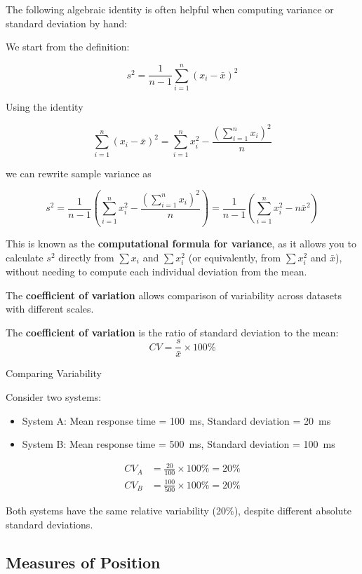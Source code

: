 The following algebraic identity is often helpful when computing variance or standard deviation by hand:

We start from the definition:

\[
s^2 = \frac{1}{n-1}\sum_{i=1}^n (x_i - \bar{x})^2
\]

Using the identity

\[
\sum_{i=1}^n (x_i - \bar{x})^2 = \sum_{i=1}^n x_i^2 - \frac{\left(\sum_{i=1}^n x_i \right)^2}{n}
\]

we can rewrite sample variance as

\[
s^2 = \frac{1}{n-1} \left( \sum_{i=1}^n x_i^2 - \frac{\left(\sum_{i=1}^n x_i\right)^2}{n} \right) =\frac{1}{n-1}\left(\sum_{i=1}^n x_i^2-n \bar{x}^2\right)
\]

This is known as the \textbf{computational formula for variance}, as it allows you to calculate $s^2$ directly from $\sum x_i$ and $\sum x_i^2$ (or equivalently, from $\sum x_i^2$ and $\bar{x}$), without needing to compute each individual deviation from the mean.


The \textbf{coefficient of variation} allows comparison of variability across datasets with different scales.

\begin{definition}
The \textbf{coefficient of variation} is the ratio of standard deviation to the mean:
\[
CV = \frac{s}{\bar{x}} \times 100\%
\]
\end{definition}

\begin{example} Comparing Variability

Consider two systems:
\begin{itemize}
    \item System A: Mean response time = 100~ms, Standard deviation = 20~ms
    \item System B: Mean response time = 500~ms, Standard deviation = 100~ms
\end{itemize}

\begin{align*}
CV_A &= \frac{20}{100} \times 100\% = 20\% \\
CV_B &= \frac{100}{500} \times 100\% = 20\%
\end{align*}

Both systems have the same relative variability (20\%), despite different absolute standard deviations.
\end{example}

\subsection*{Measures of Position}

